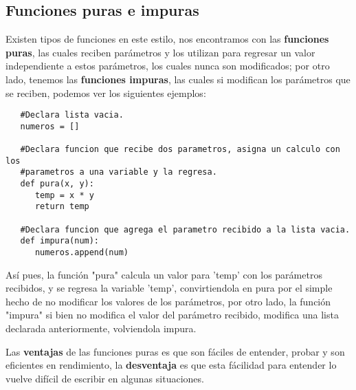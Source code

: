 \subsection{Funciones puras e impuras}
\hspace{0.55cm}Existen tipos de funciones en este estilo, nos encontramos con las \textbf{funciones puras}, las cuales reciben parámetros y los utilizan para regresar un valor independiente a estos parámetros, los cuales nunca son modificados; por otro lado, tenemos las \textbf{funciones impuras}, las cuales si modifican los parámetros que se reciben, podemos ver los siguientes ejemplos:
\begin{lstlisting}
   #Declara lista vacia.
   numeros = []

   #Declara funcion que recibe dos parametros, asigna un calculo con los
   #parametros a una variable y la regresa.
   def pura(x, y):
      temp = x * y
      return temp
   
   #Declara funcion que agrega el parametro recibido a la lista vacia.
   def impura(num):
      numeros.append(num)
\end{lstlisting}

Así pues, la función "pura" calcula un valor para 'temp' con los parámetros recibidos, y se regresa la variable 'temp', convirtiendola en pura por el simple hecho de no modificar los valores de los parámetros, por otro lado, la función "impura" si bien no modifica el valor del parámetro recibido, modifica una lista declarada anteriormente, volviendola impura.

Las \textbf{ventajas} de las funciones puras es que son fáciles de entender, probar y son eficientes en rendimiento, la \textbf{desventaja} es que esta fácilidad para entender lo vuelve difícil de escribir en algunas situaciones.